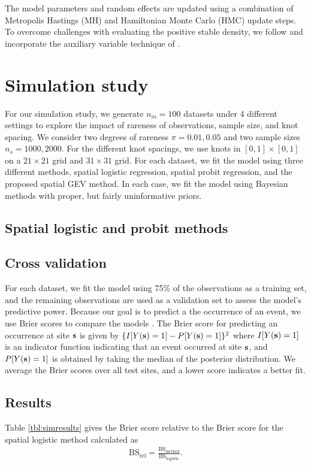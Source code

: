 \documentclass[11pt]{article}
\begin{document}
The model parameters and random effects are updated using a combination of Metropolis Hastings (MH) and Hamiltonian Monte Carlo (HMC) update steps.
To overcome challenges with evaluating the positive stable density, we follow \citet{Reich2012} and incorporate the auxiliary variable technique of \citet{Stephenson2009}.


\section{Simulation study}\label{s:sim}

For our simulation study, we generate $n_m = 100$ datasets under 4 different settings to explore the impact of rareness of observations, sample size, and knot spacing.
We consider two degrees of rareness $\pi = 0.01, 0.05$ and two sample sizes $n_s = 1000, 2000$.
For the different knot spacings, we use knots in $[0, 1] \times [0, 1]$ on a $21 \times 21$ grid and $31 \times 31$ grid.
For each dataset, we fit the model using three different methods, spatial logistic regression, spatial probit regression, and the proposed spatial GEV method.
In each case, we fit the model using Bayesian methods with proper, but fairly uninformative priors.


\subsection{Spatial logistic and probit methods}

\subsection{Cross validation}\label{s:modelselect}
For each dataset, we fit the model using 75\% of the observations as a training set, and the remaining observations are used as a validation set to assess the model's predictive power.
Because our goal is to predict a the occurrence of an event, we use Brier scores to compare the models \citep{Gneiting2007}.
The Brier score for predicting an occurrence at site $\mbox{\bf s}$ is given by $\{I[Y(\mbox{\bf s})=1] - P[Y(\mbox{\bf s})=1]\}^2$ where $I[Y(\mbox{\bf s}) = 1]$ is an indicator function indicating that an event occurred at site $\mbox{\bf s}$, and $P[Y(\mbox{\bf s}) = 1]$ is obtained by taking the median of the posterior distribution.
We average the Brier scores over all test sites, and a lower score indicates a better fit.

\subsection{Results}
Table \ref{tbl:simresults} gives the Brier score relative to the Brier score for the spatial logistic method calculated as
\begin{align}
  \text{BS}_{\text{rel}} = \frac{\text{BS}_{\text{method}}}{\text{BS}_{\text{logistic}}}.
\end{align}
\end{document}
